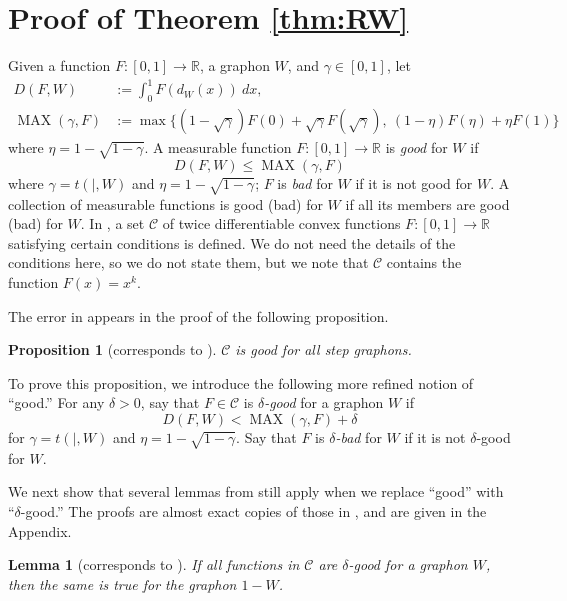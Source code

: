 \documentclass[11pt]{article}
\newtheorem{lem}[thm]{Lemma}
\newtheorem{prop}[thm]{Proposition}
\theoremstyle{definition}
\newcommand{\R}{\mathbb{R}}
\newcommand{\C}{\mathscr{C}}
\begin{document}
\section{Proof of Theorem \ref{thm:RW}}\label{sec:stars}
 Given a function $F: [0,1] \to \mathbb R$, a graphon $W$, and $\gamma \in [0,1]$, let \begin{align*}
    D (F, W) &:= \int_0^1 F (d_W (x)) ~dx, \\
    \operatorname{MAX} (\gamma, F) &:= \max \{ (1 - \sqrt{\gamma}) F (0) + \sqrt{\gamma} F (\sqrt{\gamma}),~ (1 - \eta) F(\eta) + \eta F(1) \}
\end{align*} where $\eta = 1 - \sqrt{1 - \gamma}$.
A measurable function $F: [0,1] \to \R$ is {\em good} for $W$ if \[ 
D(F, W) \le \operatorname{MAX} (\gamma, F)\] where $\gamma = t (|, W)$ and $\eta = 1 - \sqrt{1 - \gamma}$; $F$ is {\em bad} for $W$ if it is not good for $W$.
A collection of measurable functions is good (bad) for $W$ if all its members are good (bad) for $W$.
In \cite{RW}, a set $\C$ of twice differentiable convex functions $F: [0,1] \to \R$ satisfying certain conditions is defined. We do not need the details of the conditions here, so we do not state them, but we note that $\C$ contains the function $F(x)=x^k$.

The error in \cite{RW} appears in the proof of the following proposition.

\begin{prop}[corresponds to {\cite[Proposition 3.7]{RW}}]\label{prop:step}
	$\C$ is good for all step graphons.
\end{prop}

To  prove this proposition, we introduce the following more refined notion of ``good.'' For any $\delta >0$, say that $F \in \C$ is {\em $\delta$-good} for a graphon $W$ if \[ D(F, W) < \operatorname{MAX} (\gamma, F)   + \delta \] for $\gamma = t (|, W)$ and $\eta = 1 - \sqrt{1 - \gamma}$. Say that $F$ is {\em $\delta$-bad} for $W$ if it is not $\delta$-good for $W$.

We next show that several lemmas from \cite{RW} still apply when we replace ``good'' with ``$\delta$-good.'' The proofs are almost exact copies of those in \cite{RW}, and are given in the Appendix.

\begin{lem}[corresponds to {\cite[Lemma 3.2]{RW}}]\label{lem:1-W}
    If all functions in $\C$ are $\delta$-good for a graphon $W$, then the same is true for the graphon $1 - W$.
\end{lem}
\end{document}
